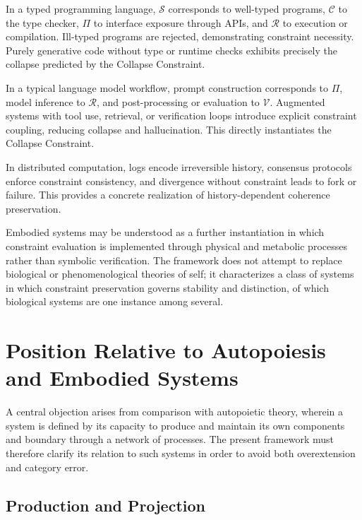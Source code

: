 \documentclass[12pt, a4paper]{article}
\theoremstyle{plain}
\theoremstyle{definition}
\theoremstyle{remark}
\begin{document}
In a typed programming language, $\mathcal{S}$ corresponds to well-typed programs, $\mathcal{C}$ to the type checker, $\Pi$ to interface exposure through APIs, and $\mathcal{R}$ to execution or compilation. Ill-typed programs are rejected, demonstrating constraint necessity. Purely generative code without type or runtime checks exhibits precisely the collapse predicted by the Collapse Constraint.

In a typical language model workflow, prompt construction corresponds to $\Pi$, model inference to $\mathcal{R}$, and post-processing or evaluation to $\mathcal{V}$. Augmented systems with tool use, retrieval, or verification loops introduce explicit constraint coupling, reducing collapse and hallucination. This directly instantiates the Collapse Constraint.

In distributed computation, logs encode irreversible history, consensus protocols enforce constraint consistency, and divergence without constraint leads to fork or failure. This provides a concrete realization of history-dependent coherence preservation.

Embodied systems may be understood as a further instantiation in which constraint evaluation is implemented through physical and metabolic processes rather than symbolic verification. The framework does not attempt to replace biological or phenomenological theories of self; it characterizes a class of systems in which constraint preservation governs stability and distinction, of which biological systems are one instance among several.

\section{Position Relative to Autopoiesis and Embodied Systems}

A central objection arises from comparison with autopoietic theory, wherein a system is defined by its capacity to produce and maintain its own components and boundary through a network of processes. The present framework must therefore clarify its relation to such systems in order to avoid both overextension and category error.

\subsection{Production and Projection}
\end{document}
